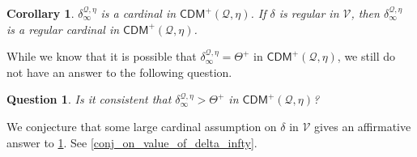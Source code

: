 \documentclass{amsart}
\newtheorem{cor}[dfn]{Corollary}
\newtheorem{ques}[dfn]{Question}
\begin{document}
\begin{cor}\label{main_thm_3}
$\delta^{\mathcal{Q}, \eta}_{\infty}$ is a cardinal in $\mathsf{CDM}^{+}(\mathcal{Q}, \eta)$.
If $\delta$ is regular in $\mathcal{V}$, then $\delta^{\mathcal{Q}, \eta}_{\infty}$ is a regular cardinal in $\mathsf{CDM}^{+}(\mathcal{Q}, \eta)$.
\end{cor}

While we know that it is possible that $\delta^{\mathcal{Q}, \eta}_{\infty}=\Theta^+$ in $\mathsf{CDM}^+(\mathcal{Q}, \eta)$, we still do not have an answer to the following question.

\begin{ques}\label{ques_on_delta_infty}
Is it consistent that $\delta^{\mathcal{Q}, \eta}_{\infty}>\Theta^+$ in $\mathsf{CDM}^+(\mathcal{Q}, \eta)$?
\end{ques}

We conjecture that some large cardinal assumption on $\delta$ in $\mathcal{V}$ gives an affirmative answer to \cref{ques_on_delta_infty}.
See \cref{conj_on_value_of_delta_infty}.
\end{document}
